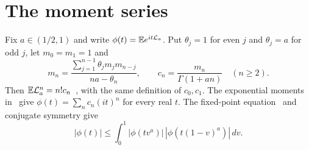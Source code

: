 \section{The moment series}
Fix $a\in(1/2,1)$ and write $\phi(t)=\mathbb{E} e^{it\mathcal L_a}$.
Put $\theta_j=1$ for even $j$ and $\theta_j=a$ for odd $j$, let
$m_0=m_1=1$ and
\[
 m_n=\frac{\sum_{j=1}^{n-1}\theta_jm_jm_{n-j}}{na-\theta_n},
 \qquad c_n=\frac{m_n}{\Gamma(1+an)}\quad(n\ge2).
\]
Then $\mathbb{E}\mathcal L_a^n=n!c_n$~\cite[Theorem~1.4]{glr2026},
with the same definition of $c_0,c_1$.
The exponential moments in~\cite[Corollary~2.11]{glr2026} give
$\phi(t)=\sum_nc_n(it)^n$ for every real $t$.
The fixed-point equation~\cite[Theorem~1.1 and (2.10)]{glr2026}
and conjugate symmetry give
\begin{equation}\label{eq:thr-fixed}
 |\phi(t)|\le\int_0^1|\phi(tv^a)|\,
                 |\phi(t(1-v)^a)|\,dv.
\end{equation}
